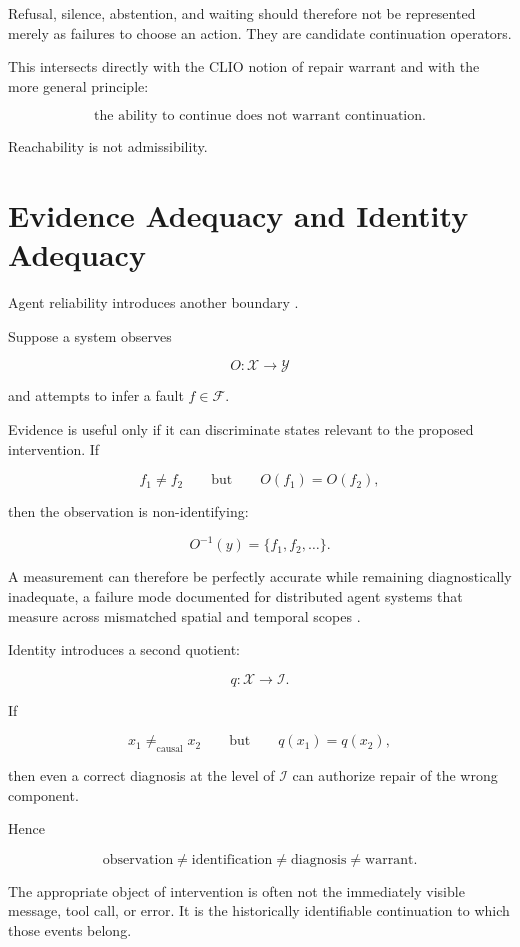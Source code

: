 \documentclass[11pt]{article}
\begin{document}
Refusal, silence, abstention, and waiting should therefore not be represented merely as failures to choose an action. They are candidate continuation operators.

This intersects directly with the CLIO notion of repair warrant and with the more general principle:

\[ \boxed{ \text{the ability to continue does not warrant continuation}. }\]

Reachability is not admissibility.

\section{Evidence Adequacy and Identity Adequacy}

Agent reliability introduces another boundary \cite{shaikh2026agentmesh}.

Suppose a system observes

\[ O:\mathcal X\rightarrow\mathcal Y\]

and attempts to infer a fault $f\in\mathcal F$.

Evidence is useful only if it can discriminate states relevant to the proposed intervention. If

\[ f_1\neq f_2 \qquad\text{but}\qquad O(f_1)=O(f_2),\]

then the observation is non-identifying:

\[ O^{-1}(y)=\{f_1,f_2,\ldots\}.\]

A measurement can therefore be perfectly accurate while remaining diagnostically inadequate, a failure mode documented for distributed agent systems that measure across mismatched spatial and temporal scopes \cite{shi2026spatiotemporal}.

Identity introduces a second quotient:

\[ q:\mathcal X\rightarrow\mathcal I.\]

If

\[ x_1\neq_{\mathrm{causal}}x_2 \qquad\text{but}\qquad q(x_1)=q(x_2),\]

then even a correct diagnosis at the level of $\mathcal I$ can authorize repair of the wrong component.

Hence

\[ \boxed{ \text{observation} \neq \text{identification} \neq \text{diagnosis} \neq \text{warrant}. }\]

The appropriate object of intervention is often not the immediately visible message, tool call, or error. It is the historically identifiable continuation to which those events belong.
\end{document}
